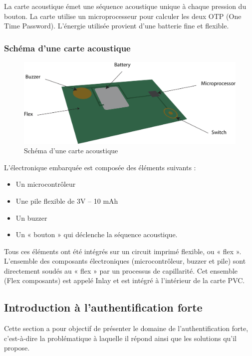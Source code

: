 La carte acoustique émet une séquence acoustique unique à chaque pression du bouton.
La carte utilise un microprocesseur pour calculer les deux OTP (One Time Password).
L’énergie utilisée provient d’une batterie fine et flexible.

\subsubsection{Schéma d’une carte acoustique}
\begin{figure}[!htbp]
  \centering
    \includegraphics[scale=0.6]{images/carteinside}
  \caption{Schéma d’une carte acoustique}
\end{figure}

L’électronique embarquée est composée des éléments suivants :
\begin{itemize}
\item Un microcontrôleur
\item Une pile flexible de 3V – 10 mAh
\item Un buzzer
\item Un « bouton » qui déclenche la séquence acoustique.\\
\end{itemize}

Tous ces éléments ont été intégrés sur un circuit imprimé flexible, ou « flex ». L’ensemble des composants électroniques (microcontrôleur, buzzer et pile) sont directement soudés au « flex » par un processus de capillarité. Cet ensemble (Flex composants) est appelé Inlay et est intégré à l’intérieur de la carte PVC.

\subsection{Introduction à l’authentification forte}

Cette section a pour objectif de présenter le domaine de l’authentification forte, c'est-à-dire la problématique à laquelle il répond ainsi que les solutions qu’il propose.

